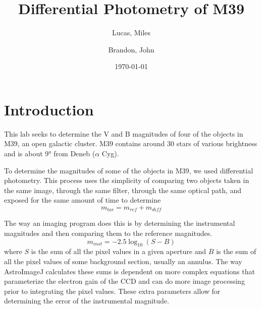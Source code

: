 \documentclass[%
aip,
jmp,
reprint,
floatfix
]{revtex4-1}
\begin{document}
	\title[Photometry of M39]{Differential Photometry of M39}

	\author{Lucas, Miles}
	\author{Brandon, John}

	\date{\today}



	\begin{abstract}


	\end{abstract}

	\maketitle


	\section{Introduction}

	This lab seeks to determine the V and B magnitudes of four of the objects in M39, an open galactic cluster. M39 contains around 30 stars of various brightness and is about \ang{9} from Deneb ($\alpha$ Cyg). 
	
	To determine the magnitudes of some of the objects in M39, we used differential photometry. This process uses the simplicity of comparing two objects taken in the same image, through the same filter, through the same optical path, and exposed for the same amount of time to determine
	\begin{equation}
		m_{tar} = m_{ref} + m_{diff}
		\label{eqn:diff}
	\end{equation}
	
	The way an imaging program does this is by determining the instrumental magnitudes and then comparing them to the reference magnitudes. 
	\begin{equation}
	 	m_{inst} = -2.5 \log_{10}(S-B)
	 	\label{eqn:inst}
	\end{equation}
	where $S$ is the sum of all the pixel values in a given aperture and $B$ is the sum of all the pixel values of some background section, usually an annulus. The way AstroImageJ calculates these sums is dependent on more complex equations that parameterize the electron gain of the CCD and can do more image processing prior to integrating the pixel values. These extra parameters allow for determining the error of the instrumental magnitude.
	
\end{document}
